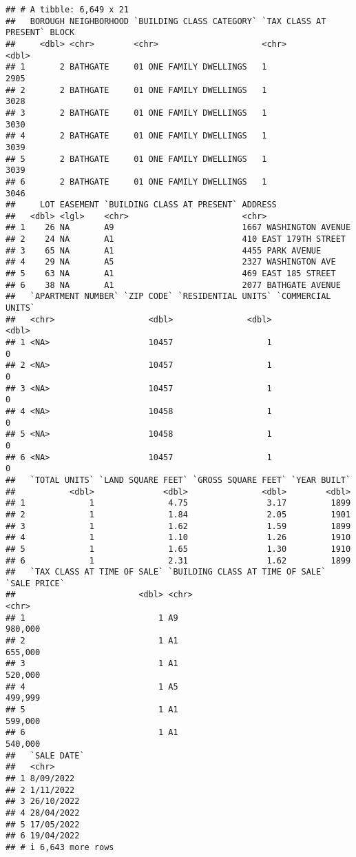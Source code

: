 \documentclass[
]{article}
\begin{document}
\begin{verbatim}
## # A tibble: 6,649 x 21
##   BOROUGH NEIGHBORHOOD `BUILDING CLASS CATEGORY` `TAX CLASS AT PRESENT` BLOCK
##     <dbl> <chr>        <chr>                     <chr>                  <dbl>
## 1       2 BATHGATE     01 ONE FAMILY DWELLINGS   1                       2905
## 2       2 BATHGATE     01 ONE FAMILY DWELLINGS   1                       3028
## 3       2 BATHGATE     01 ONE FAMILY DWELLINGS   1                       3030
## 4       2 BATHGATE     01 ONE FAMILY DWELLINGS   1                       3039
## 5       2 BATHGATE     01 ONE FAMILY DWELLINGS   1                       3039
## 6       2 BATHGATE     01 ONE FAMILY DWELLINGS   1                       3046
##     LOT EASEMENT `BUILDING CLASS AT PRESENT` ADDRESS               
##   <dbl> <lgl>    <chr>                       <chr>                 
## 1    26 NA       A9                          1667 WASHINGTON AVENUE
## 2    24 NA       A1                          410 EAST 179TH STREET 
## 3    65 NA       A1                          4455 PARK AVENUE      
## 4    29 NA       A5                          2327 WASHINGTON AVE   
## 5    63 NA       A1                          469 EAST 185 STREET   
## 6    38 NA       A1                          2077 BATHGATE AVENUE  
##   `APARTMENT NUMBER` `ZIP CODE` `RESIDENTIAL UNITS` `COMMERCIAL UNITS`
##   <chr>                   <dbl>               <dbl>              <dbl>
## 1 <NA>                    10457                   1                  0
## 2 <NA>                    10457                   1                  0
## 3 <NA>                    10457                   1                  0
## 4 <NA>                    10458                   1                  0
## 5 <NA>                    10458                   1                  0
## 6 <NA>                    10457                   1                  0
##   `TOTAL UNITS` `LAND SQUARE FEET` `GROSS SQUARE FEET` `YEAR BUILT`
##           <dbl>              <dbl>               <dbl>        <dbl>
## 1             1               4.75                3.17         1899
## 2             1               1.84                2.05         1901
## 3             1               1.62                1.59         1899
## 4             1               1.10                1.26         1910
## 5             1               1.65                1.30         1910
## 6             1               2.31                1.62         1899
##   `TAX CLASS AT TIME OF SALE` `BUILDING CLASS AT TIME OF SALE` `SALE PRICE`
##                         <dbl> <chr>                            <chr>       
## 1                           1 A9                               980,000     
## 2                           1 A1                               655,000     
## 3                           1 A1                               520,000     
## 4                           1 A5                               499,999     
## 5                           1 A1                               599,000     
## 6                           1 A1                               540,000     
##   `SALE DATE`
##   <chr>      
## 1 8/09/2022  
## 2 1/11/2022  
## 3 26/10/2022 
## 4 28/04/2022 
## 5 17/05/2022 
## 6 19/04/2022 
## # i 6,643 more rows
\end{verbatim}
\end{document}
